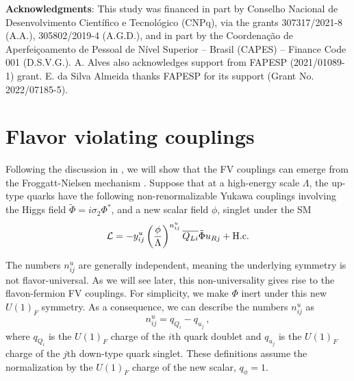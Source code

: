 \documentclass[prd,amsfonts,onecolumn,superscriptaddress,aps,nofootinbib,11pt]{revtex4-1}
\begin{document}
	
\bigskip{}
	
\textbf{Acknowledgments}: This study was financed in part by Conselho Nacional de Desenvolvimento Científico e Tecnológico (CNPq), via the grants 307317/2021-8 (A.A.), 305802/2019-4 (A.G.D.), and in part by the Coordenação de Aperfeiçoamento de Pessoal de Nível Superior – Brasil (CAPES) – Finance Code 001 (D.S.V.G.). A. Alves also acknowledges support from FAPESP (2021/01089-1) grant. E. da Silva Almeida thanks FAPESP for  its  support  (Grant  No.  2022/07185-5).
	
%


\appendix


\section{Flavor violating couplings}
\label{app:couplings}

Following the discussion in \cite{Ema:2016ops}, we will show that the FV couplings can emerge from the Froggatt-Nielsen mechanism \cite{Froggatt:1978nt}. Suppose that at a high-energy scale $\Lambda$, the up-type quarks have the following non-renormalizable Yukawa couplings involving the Higgs field $\tilde{\Phi} = i  \sigma_2 \Phi^*$, and a new scalar field $\phi$, singlet under the SM
\begin{equation}\label{eq:yuk}
    \mathcal{L} = -y^u_{ij} \left( \frac{\phi}{\Lambda} \right)^{n_{ij}^u} \overline{Q_{Li}} \tilde{\Phi} u_{Rj} + \rm{H.c.}
\end{equation}

The numbers $n_{ij}^u$ are generally independent, meaning the underlying symmetry is not flavor-universal. As we will see later, this non-universality gives rise to the flavon-fermion FV couplings. For simplicity, we make $\Phi$ inert under this new $U(1)_F$ symmetry. As a consequence, we can describe the numbers $n_{ij}^u$ as
\begin{equation}\label{eq:n}
    n_{ij}^u = q_{Q_i} - q_{u_j} \,,
\end{equation}
where $q_{Q_i}$ is the $U(1)_F$ charge of the $i$th quark doublet and $q_{u_j}$ is the $U(1)_F$ charge of the $j$th down-type quark singlet. These definitions assume the normalization by the $U(1)_F$ charge of the new scalar, $q_\phi = 1$.
\end{document}
